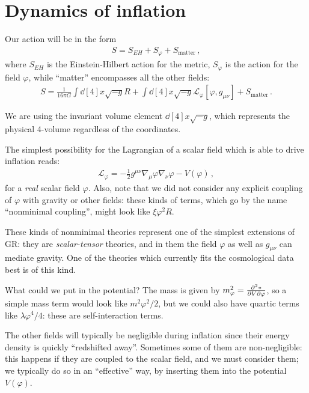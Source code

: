 \documentclass[main.tex]{subfiles}
\begin{document}
\section{Dynamics of inflation}


Our action will be in the form 
%
\begin{align}
S = S_{EH} + S_\varphi + S _{\text{matter}}
\,,
\end{align}
%
where \(S_{EH}\) is the Einstein-Hilbert action for the metric, \(S_\varphi \) is the action for the field \(\varphi \), while ``matter'' encompasses all the other fields:
%
\begin{align}
S = \frac{1}{16 \pi G} \int \dd[4]{x} \sqrt{-g} R 
+ \int \dd[4]{x} \sqrt{-g} \mathscr{L}_\varphi [\varphi , g_{\mu \nu }]
+ S _{\text{matter}}
\,.
\end{align}

We are using the invariant volume element \(\dd[4]{x} \sqrt{-g}\), which represents the physical 4-volume regardless of the coordinates.

The simplest possibility for the Lagrangian of a scalar field which is able to drive inflation reads: 
%
\begin{align}
\mathscr{L}_{\varphi } = -\frac{1}{2} g^{\mu \nu } \nabla_{\mu } \varphi \nabla_{\nu } \varphi  - V(\varphi )
\,,
\end{align}
%
for a \emph{real} scalar field \(\varphi \).
Also, note that we did not consider any explicit coupling of \(\varphi \) with gravity or other fields: these kinds of terms, which go by the name ``nonminimal coupling'', might look like \(\xi \varphi^2 R\).

These kinds of nonminimal theories represent one of the simplest extensions of GR: they are \emph{scalar-tensor} theories, and in them the field \(\varphi \) as well as \(g_{\mu \nu }\) can mediate gravity. 
One of the theories which currently fits the cosmological data best is of this kind. 

What could we put in the potential? The mass is given by \(m_\varphi^2 = \pdv[2]*{V}{\varphi }\), so a simple mass term would look like \(m^2 \varphi^2 / 2\), but we could also have quartic terms like \(\lambda \varphi^{4} / 4\): these are self-interaction terms. 

The other fields will typically be negligible during inflation since their energy density is quickly ``redshifted away''. 
Sometimes some of them are non-negligible: this happens if they are coupled to the scalar field, and we must consider them; we typically do so in an ``effective'' way, by inserting them into the potential \(V(\varphi )\). 
\end{document}
